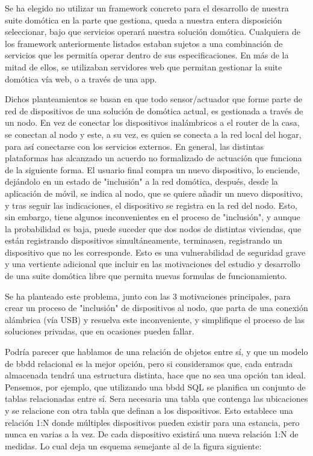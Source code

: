 Se ha elegido no utilizar un \gls{framework} concreto para el desarrollo de nuestra suite domótica en la parte que gestiona, queda a nuestra entera disposición seleccionar, bajo que servicios operará nuestra solución domótica. Cualquiera de los \gls{framework} anteriormente listados estaban sujetos a una combinación de servicios que les permitía operar dentro de sus especificaciones. En más de la mitad de ellos, se utilizaban servidores web que permitan gestionar la suite domótica vía web, o a través de una \gls{app}.

Dichos planteamientos se basan en que todo sensor/actuador que forme parte de red de dispositivos de una solución de domótica actual, es gestionada a través de un nodo. En vez de conectar los dispositivos inalámbricos a el router de la casa, se conectan al nodo y este, a su vez, es quien se conecta a la red local del hogar, para así conectarse con los servicios externos. En general, las distintas plataformas has alcanzado un acuerdo no formalizado de actuación que funciona de la siguiente forma. El usuario final compra un nuevo dispositivo, lo enciende, dejándolo en un estado de "inclusión" a la red domótica, después, desde la aplicación de móvil, se indica al nodo, que se quiere añadir un nuevo dispositivo, y tras seguir las indicaciones, el dispositivo se registra en la red del nodo. Esto, sin embargo, tiene algunos inconvenientes en el proceso de "inclusión", y aunque la probabilidad es baja, puede suceder que dos nodos de distintas viviendas, que están registrando dispositivos simultáneamente, terminasen, registrando un dispositivo que no les corresponde. Esto es una vulnerabilidad de seguridad grave y una vertiente adicional que incluir en las motivaciones del estudio y desarrollo de una suite domótica libre que permita nuevas formulas de funcionamiento.

Se ha planteado este problema, junto con las 3 motivaciones principales, para crear un proceso de "inclusión" de dispositivos al nodo, que parta de una conexión alámbrica (vía USB) y resuelva este inconveniente, y simplifique el proceso de las soluciones privadas, que en ocasiones pueden fallar.

Podría parecer que hablamos de una relación de objetos entre sí, y que un modelo de \gls{bbdd} relacional es la mejor opción, pero si consideramos que, cada entrada almacenada tendrá una estructura distinta, hace que no sea una opción tan ideal. Pensemos, por ejemplo, que utilizando una \gls{bbdd} SQL se planifica un conjunto de tablas relacionadas entre sí. Sera necesaria una tabla que contenga las ubicaciones y se relacione con otra tabla que definan a los dispositivos. Esto establece una relación 1:N donde múltiples dispositivos pueden existir para una estancia, pero nunca en varias a la vez. De cada dispositivo existirá una nueva relación 1:N de medidas. Lo cual deja un esquema semejante al de la figura siguiente:


